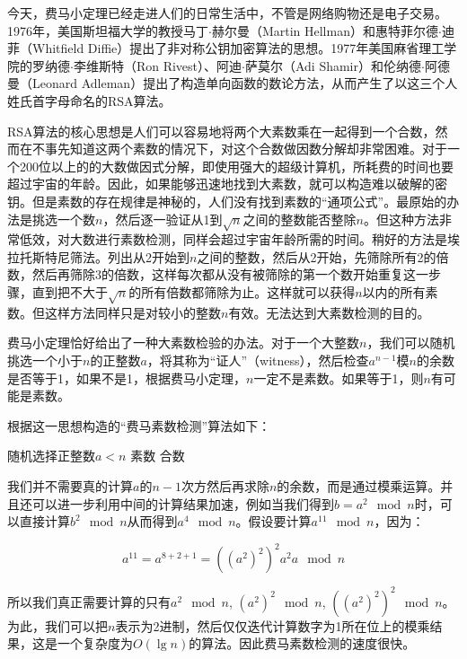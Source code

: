 \documentclass{article}
\begin{document}
\vspace{5mm}

今天，费马小定理已经走进人们的日常生活中，不管是网络购物还是电子交易。1976年，美国斯坦福大学的教授马丁$\cdot$赫尔曼（Martin Hellman）和惠特菲尔德$\cdot$迪菲（Whitfield Diffie）提出了非对称公钥加密算法的思想。1977年美国麻省理工学院的罗纳德$\cdot$李维斯特（Ron Rivest）、阿迪$\cdot$萨莫尔（Adi Shamir）和伦纳德$\cdot$阿德曼（Leonard Adleman）提出了构造单向函数的数论方法，从而产生了以这三个人姓氏首字母命名的RSA算法。

RSA算法的核心思想是人们可以容易地将两个大素数乘在一起得到一个合数，然而在不事先知道这两个素数的情况下，对这个合数做因数分解却非常困难。对于一个200位以上的的大数做因式分解，即使用强大的超级计算机，所耗费的时间也要超过宇宙的年龄。因此，如果能够迅速地找到大素数，就可以构造难以破解的密钥。但是素数的存在规律是神秘的，人们没有找到素数的“通项公式”。最原始的办法是挑选一个数$n$，然后逐一验证从1到$\sqrt{n}$之间的整数能否整除$n$。但这种方法非常低效，对大数进行素数检测，同样会超过宇宙年龄所需的时间。稍好的方法是埃拉托斯特尼筛法。列出从2开始到$n$之间的整数，然后从2开始，先筛除所有2的倍数，然后再筛除3的倍数，这样每次都从没有被筛除的第一个数开始重复这一步骤，直到把不大于$\sqrt{n}$的所有倍数都筛除为止。这样就可以获得$n$以内的所有素数。但这样方法同样只是对较小的整数$n$有效。无法达到大素数检测的目的。

费马小定理恰好给出了一种大素数检验的办法。对于一个大整数$n$，我们可以随机挑选一个小于$n$的正整数$a$，将其称为“证人”（witness），然后检查$a^{n-1}$模$n$的余数是否等于1，如果不是1，根据费马小定理，$n$一定不是素数。如果等于1，则$n$有可能是素数。

根据这一思想构造的“费马素数检测”算法如下：

\begin{algorithmic}
  \State 随机选择正整数$a < n$
    \State \Return 素数
  \Else
    \State \Return 合数
  \EndIf
\EndFunction
\end{algorithmic}

我们并不需要真的计算$a$的$n-1$次方然后再求除$n$的余数，而是通过模乘运算。并且还可以进一步利用中间的计算结果加速，例如当我们得到$b = a^2 \mod n$时，可以直接计算$b^2 \mod n$从而得到$a^4 \mod n$。假设要计算$a^{11} \mod n$，因为：

\[
a^{11} = a^{8 + 2 + 1} = ((a^2)^2)^2a^2a \mod n
\]

所以我们真正需要计算的只有$a^2 \mod n$, $(a^2)^2 \mod n$, $((a^2)^2)^2 \mod n$。为此，我们可以把$n$表示为2进制，然后仅仅迭代计算数字为1所在位上的模乘结果，这是一个复杂度为$O(\lg n)$的算法。因此费马素数检测的速度很快。
\end{document}
